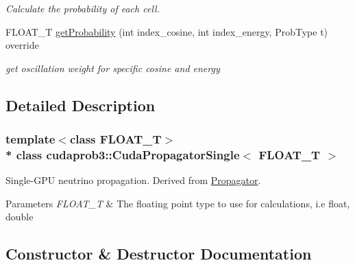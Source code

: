 \begin{DoxyCompactItemize}
\begin{DoxyCompactList}\small\item\em Calculate the probability of each cell. \end{DoxyCompactList}\item 
F\+L\+O\+A\+T\+\_\+T \hyperlink{classcudaprob3_1_1CudaPropagatorSingle_a7721f79e2e58ab959ba4e295ac8b4b0c}{get\+Probability} (int index\+\_\+cosine, int index\+\_\+energy, Prob\+Type t) override
\begin{DoxyCompactList}\small\item\em get oscillation weight for specific cosine and energy \end{DoxyCompactList}\end{DoxyCompactItemize}


\subsection{Detailed Description}
\subsubsection*{template$<$class F\+L\+O\+A\+T\+\_\+T$>$\\*
class cudaprob3\+::\+Cuda\+Propagator\+Single$<$ F\+L\+O\+A\+T\+\_\+\+T $>$}

Single-\/\+G\+PU neutrino propagation. Derived from \hyperlink{classcudaprob3_1_1Propagator}{Propagator}. 


\begin{DoxyParams}{Parameters}
{\em F\+L\+O\+A\+T\+\_\+T} & The floating point type to use for calculations, i.\+e float, double \\
\hline
\end{DoxyParams}


\subsection{Constructor \& Destructor Documentation}
